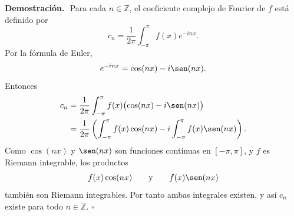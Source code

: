\documentclass[11pt,letterpaper]{article}
\newcommand{\Z}{\mathbb{Z}}
\begin{document}
\textbf{Demostración.}\,\
Para cada $n\in\Z$, el coeficiente complejo de Fourier de $f$ está definido por
\begin{equation*}
    c_n=\frac{1}{2\pi}\int_{-\pi}^{\pi} f(x)e^{-inx}.
\end{equation*}
Por la fórmula de Euler,
\begin{equation*}
    e^{-inx}=\cos(nx)-i\sen(nx).
\end{equation*}
Entonces
\begin{align*}
    c_n
    &=\frac{1}{2\pi}\int_{-\pi}^{\pi} f(x)\bigl(\cos(nx)-i\sen(nx)\bigr) \\
    &=\frac{1}{2\pi}\left(\int_{-\pi}^{\pi} f(x)\cos(nx)
    -i\int_{-\pi}^{\pi} f(x)\sen(nx)\right).
\end{align*}
Como $\cos(nx)$ y $\sen(nx)$ son funciones continuas en $[-\pi,\pi]$, y $f$ es Riemann integrable, los productos
\begin{equation*}
    f(x)\cos(nx)\qquad \text{y}\qquad f(x)\sen(nx)
\end{equation*}
también son Riemann integrables. Por tanto ambas integrales existen, y así $c_n$ existe para todo $n\in\Z$.
\hfill $\square$

\vspace{0.4cm}
\end{document}
